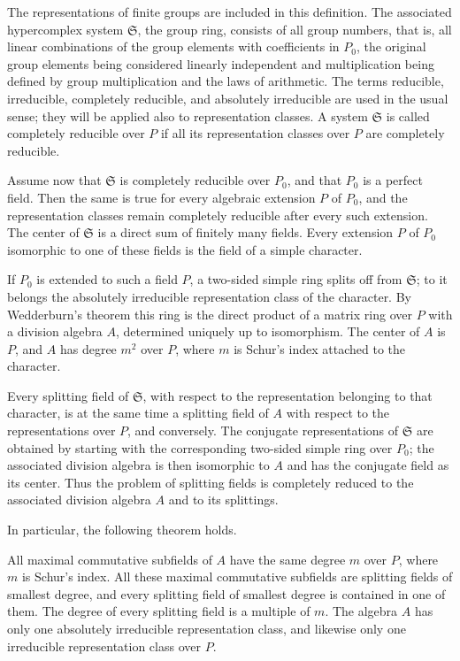 \documentclass[
  12pt,
]{article}
\begin{document}
The representations of finite groups are included in this definition.
The associated hypercomplex system \(\mathfrak S\), the group ring,
consists of all group numbers, that is, all linear combinations of the
group elements with coefficients in \(P_0\), the original group elements
being considered linearly independent and multiplication being defined
by group multiplication and the laws of arithmetic. The terms reducible,
irreducible, completely reducible, and absolutely irreducible are used
in the usual sense; they will be applied also to representation classes.
A system \(\mathfrak S\) is called completely reducible over \(P\) if
all its representation classes over \(P\) are completely reducible.

Assume now that \(\mathfrak S\) is completely reducible over \(P_0\),
and that \(P_0\) is a perfect field. Then the same is true for every
algebraic extension \(P\) of \(P_0\), and the representation classes
remain completely reducible after every such extension. The center of
\(\mathfrak S\) is a direct sum of finitely many fields. Every extension
\(P\) of \(P_0\) isomorphic to one of these fields is the field of a
simple character.

If \(P_0\) is extended to such a field \(P\), a two-sided simple ring
splits off from \(\mathfrak S\); to it belongs the absolutely
irreducible representation class of the character. By Wedderburn's
theorem this ring is the direct product of a matrix ring over \(P\) with
a division algebra \(A\), determined uniquely up to isomorphism. The
center of \(A\) is \(P\), and \(A\) has degree \(m^2\) over \(P\), where
\(m\) is Schur's index attached to the character.

Every splitting field of \(\mathfrak S\), with respect to the
representation belonging to that character, is at the same time a
splitting field of \(A\) with respect to the representations over \(P\),
and conversely. The conjugate representations of \(\mathfrak S\) are
obtained by starting with the corresponding two-sided simple ring over
\(P_0\); the associated division algebra is then isomorphic to \(A\) and
has the conjugate field as its center. Thus the problem of splitting
fields is completely reduced to the associated division algebra \(A\)
and to its splittings.

In particular, the following theorem holds.

All maximal commutative subfields of \(A\) have the same degree \(m\)
over \(P\), where \(m\) is Schur's index. All these maximal commutative
subfields are splitting fields of smallest degree, and every splitting
field of smallest degree is contained in one of them. The degree of
every splitting field is a multiple of \(m\). The algebra \(A\) has only
one absolutely irreducible representation class, and likewise only one
irreducible representation class over \(P\).
\end{document}
